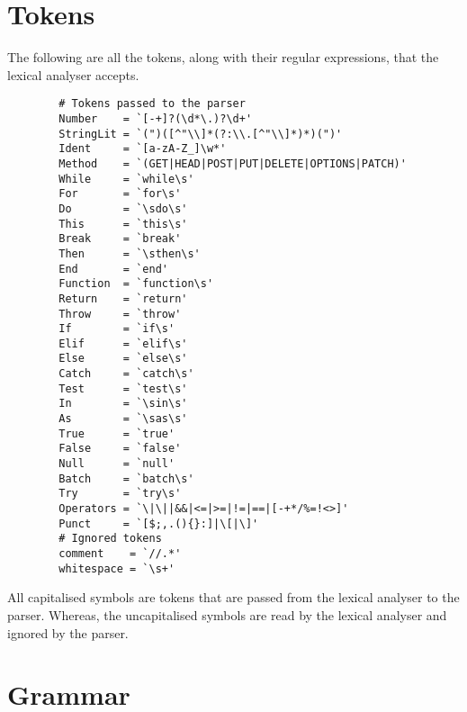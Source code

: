 \section{Tokens}

The following are all the tokens, along with their regular expressions, that the lexical analyser accepts.

\begin{center}
    \begin{verbatim}
        # Tokens passed to the parser
        Number    = `[-+]?(\d*\.)?\d+'
        StringLit = `(")([^"\\]*(?:\\.[^"\\]*)*)(")'
        Ident     = `[a-zA-Z_]\w*'
        Method    = `(GET|HEAD|POST|PUT|DELETE|OPTIONS|PATCH)'
        While     = `while\s'
        For       = `for\s'
        Do        = `\sdo\s'
        This      = `this\s'
        Break     = `break'
        Then      = `\sthen\s'
        End       = `end'
        Function  = `function\s'
        Return    = `return'
        Throw     = `throw'
        If        = `if\s'
        Elif      = `elif\s'
        Else      = `else\s'
        Catch     = `catch\s'
        Test      = `test\s'
        In        = `\sin\s'
        As        = `\sas\s'
        True      = `true'
        False     = `false'
        Null      = `null'
        Batch     = `batch\s'
        Try       = `try\s'
        Operators = `\|\||&&|<=|>=|!=|==|[-+*/%=!<>]'
        Punct     = `[$;,.(){}:]|\[|\]'
        # Ignored tokens
        comment    = `//.*'
        whitespace = `\s+'
    \end{verbatim}
\end{center}

All capitalised symbols are tokens that are passed from the lexical analyser to the parser. Whereas, the uncapitalised symbols are read by the lexical analyser and ignored by the parser.

\section{Grammar}

